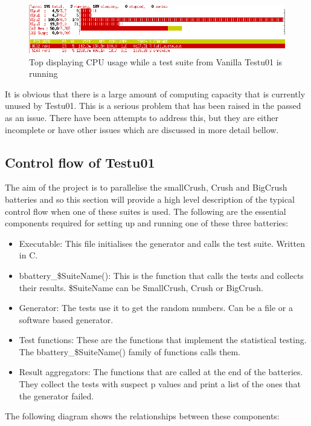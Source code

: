 \begin{figure}[h]
\includegraphics[scale=0.5]{top_full_suite}
\caption{Top displaying CPU usage while a test suite from Vanilla Testu01 is running\cite{full-suite}}
\label{fig:cpu_serial_tests}
\end{figure}

It is obvious that there is a large amount of computing capacity that is currently unused by Testu01. This is a serious problem that has been raised in the passed as an issue\cite{statistical-testing}. There have been attempts to address this, but they are either incomplete or have other issues which are discussed in more detail bellow.

\subsection{Control flow of Testu01}
The aim of the project is to parallelise the smallCrush, Crush and BigCrush batteries and so this section will provide a high level description of the typical control flow when one of these suites is used. The following are the essential components required for setting up and running one of these three batteries:
\begin{itemize}
  \item Executable: This file initialises the generator and calls the test suite. Written in C.
  \item bbattery\_\$SuiteName(): This is the function that calls the tests and collects their results. \$SuiteName can be SmallCrush, Crush or BigCrush.
  \item Generator: The tests use it to get the random numbers. Can be a file or a software based generator.
  \item Test functions: These are the functions that implement the statistical testing. The bbattery\_\$SuiteName() family of functions calls them.
  \item Result aggregators: The functions that are called at the end of the batteries. They collect the tests with suspect p values and print a list of the ones that the generator failed.
\end{itemize}

The following diagram shows the relationships between these components:

